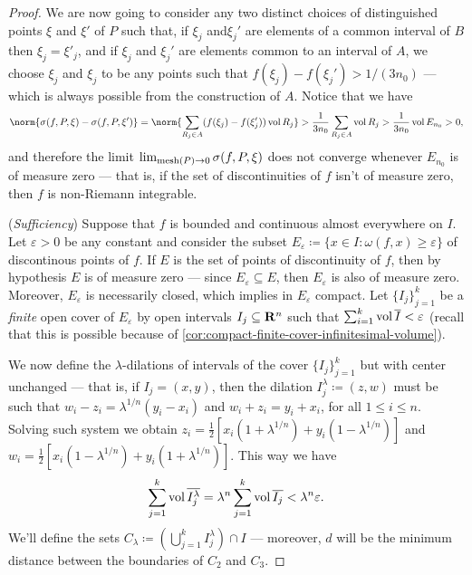 \begin{proof}
We are now going to consider any two distinct choices of distinguished points
\(\xi\) and \(\xi'\) of \(P\) such that, if \(\xi_j\) and\(\xi_j'\) are elements
of a common interval of \(B\) then \(\xi_j = \xi'_j\), and if \(\xi_j\) and
\(\xi_j'\) are elements common to an interval of \(A\), we choose \(\xi_j\) and
\(\xi_j\) to be any points such that \(f(\xi_j) - f(\xi_j') > 1/(3n_0)\) ---
which is always possible from the construction of \(A\). Notice that we have
\[
  \norm{\sigma(f, P, \xi) - \sigma(f, P, \xi')}
  = \norm{\sum_{R_{j} \in A} (f(\xi_j) - f(\xi_j')) \Vol R_j}
  > \frac 1 {3 n_0} \sum_{R_j \in A} \Vol R_j
  > \frac 1 {3 n_0} \Vol E_{n_0} > 0,
\]
and therefore the limit \(\lim_{\operatorname{mesh}(P) \to 0} \sigma(f, P, \xi)\) does not
converge whenever \(E_{n_0}\) is of measure zero --- that is, if the set of
discontinuities of \(f\) isn't of measure zero, then \(f\) is non-Riemann
integrable.

(\emph{Sufficiency}) Suppose that \(f\) is bounded and continuous almost
everywhere on \(I\). Let \(\varepsilon > 0\) be any constant and consider the
subset \(E_{\varepsilon} \coloneq \{x \in I : \omega(f, x) \geq \varepsilon\}\)
of discontinous points of \(f\). If \(E\) is the set of points of discontinuity
of \(f\), then by hypothesis \(E\) is of measure zero --- since
\(E_{\varepsilon} \subseteq E\), then \(E_{\varepsilon}\) is also of measure
zero. Moreover, \(E_{\varepsilon}\) is necessarily closed, which implies in
\(E_{\varepsilon}\) compact. Let \(\{I_{j}\}_{j=1}^k\) be a \emph{finite} open
cover of \(E_{\varepsilon}\) by open intervals \(I_j \subseteq \mathbf{R}^n\) such that
\(\sum_{i=1}^k \operatorname{vol} \overline{I} < \varepsilon\) (recall that this is possible
because of \cref{cor:compact-finite-cover-infinitesimal-volume}).

We now define the \(\lambda\)-dilations of intervals of the cover
\(\{I_{j}\}_{j=1}^k\) but with center unchanged --- that is, if \(I_j = (x,
y)\), then the dilation \(I_{j}^{\lambda} \coloneq (z, w)\) must be such that
\(w_i - z_i = \lambda^{1/n} (y_i - x_i)\) and \(w_i + z_i = y_i + x_i\), for all
\(1 \leq i \leq n\). Solving such system we obtain \(z_i = \frac 1 2 [x_i(1 +
\lambda^{1/n}) + y_i(1 - \lambda^{1/n})]\) and \(w_i = \frac 1 2 [x_i(1 -
\lambda^{1/n}) + y_i(1 + \lambda^{1/n})]\). This way we have
\[
  \sum_{j=1}^k \operatorname{vol} \overline{I_j^{\lambda}}
  = \lambda^n \sum_{j=1}^k \operatorname{vol} \overline{I_j}
  < \lambda^n \varepsilon.
\]
We'll define the sets \(C_{\lambda} \coloneq (\bigcup_{j=1}^k I_j^{\lambda})
\cap I\) --- moreover, \(d\) will be the minimum distance between the boundaries
of \(C_2\) and \(C_3\).


\end{proof}
